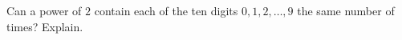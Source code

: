 Can a power of $2$ contain each of the ten digits $0,1,2,\dots,9$ the same number of times? Explain.
